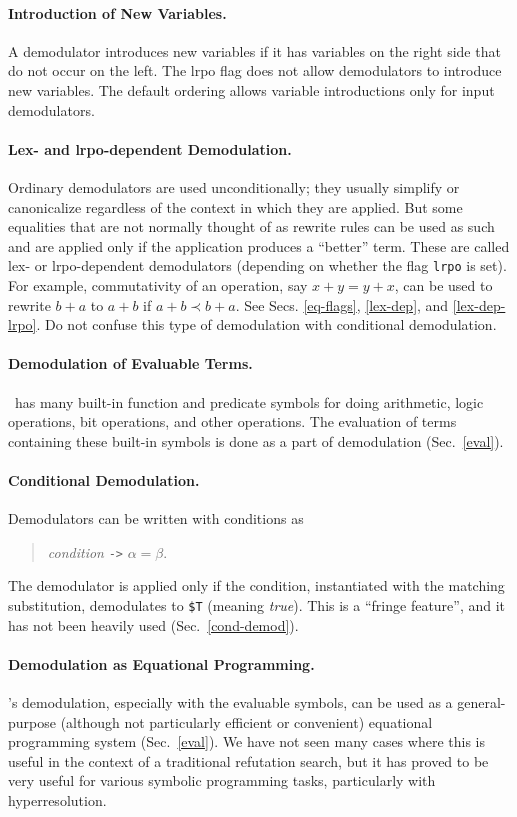 \documentclass[11pt]{article}
\begin{document}
\paragraph{Introduction of New Variables.}
A demodulator introduces
new variables if it has variables on the right side that do not
occur on the left.  The {\sc lrpo} flag does not allow demodulators
to introduce new variables.  The default ordering allows variable
introductions only for input demodulators.

\paragraph{Lex- and {\sc lrpo}-dependent Demodulation.}
Ordinary demodulators are used unconditionally; they usually
simplify or canonicalize regardless of the context in which
they are applied.  But some equalities that are not normally
thought of as rewrite rules can be used as such and are
applied only if the application produces a ``better'' term.
These are called lex- or {\sc lrpo}-dependent demodulators
(depending on whether the flag \verb:lrpo: is set).
For example, commutativity of an operation, say $x+y=y+x$, can
be used to rewrite $b+a$ to $a+b$ if $a+b\prec b+a$.
See Secs. \ref{eq-flags}, \ref{lex-dep}, and \ref{lex-dep-lrpo}.
Do not confuse this type of demodulation with conditional demodulation.

\paragraph{Demodulation of Evaluable Terms.}
\otter\ has many built-in function and predicate
symbols for doing arithmetic, logic operations, bit operations, and
other operations.  The evaluation of terms containing these built-in
symbols is done as a part of demodulation (Sec.~\ref{eval}).

\paragraph{Conditional Demodulation.}
Demodulators can be written with conditions as
\begin{verse}
{\em condition} \verb:->: $\alpha=\beta$.
\end{verse}
The demodulator is applied only if the condition, instantiated with
the matching substitution, demodulates to \verb:$T: (meaning {\em true}).
This is a ``fringe feature'', and it has not been heavily used
(Sec.~\ref{cond-demod}).

\paragraph{Demodulation as Equational Programming.}
\otter's demodulation, especially with the evaluable symbols,
can be used as a general-purpose (although not particularly efficient
or convenient) equational programming system (Sec.~\ref{eval}).
We have not seen many cases
where this is useful in the context of a traditional refutation
search, but it has proved to be very useful for various symbolic
programming tasks, particularly with hyperresolution.
\end{document}
